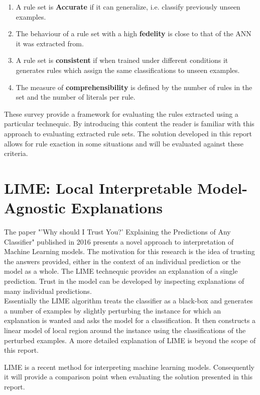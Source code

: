 \begin{enumerate}
\item A rule set is \textbf{Accurate} if it can generalize, i.e. classify previously unseen examples.
\item The behaviour of a rule set with a high \textbf{fedelity} is close to that of the ANN it was extracted from.
\item A rule set is \textbf{consistent} if when trained under different conditions it generates rules which assign the same classifications to unseen examples.
\item The measure of \textbf{comprehensibility} is defined by the number of rules in the set and the number of literals per rule.
\end{enumerate}

These survey provide a framework for evaluating the rules extracted using a particular technequic. By introducing this content the reader is familiar with this approach to evaluating extracted rule sets. The solution developed in this report allows for rule exaction in some situations and will be evaluated against these criteria. 

\section{LIME: Local Interpretable Model-Agnostic Explanations}
The paper "'Why should I Trust You?' Explaining the Predictions of Any Classifier" \cite{ribeiro2016should} published in 2016 presents a novel approach to interpretation of Machine Learning models. The motivation for this research is the idea of trusting the answers provided, either in the context of an individual prediction or the model as a whole. The LIME technequic provides an explanation of a single prediction. Trust in the model can be developed by inspecting explanations of many individual predictions.\\

Essentially the LIME algorithm treats the classifier as a black-box and generates a number of examples by slightly perturbing the instance for which an explanation is wanted and asks the model for a classification. It then constructs a linear model of local region around the instance using the classifications of the perturbed examples. A more detailed explanation of LIME is beyond the scope of this report.

LIME is a recent method for interpreting machine learning models. Consequently it will provide a comparison point when evaluating the solution presented in this report.

